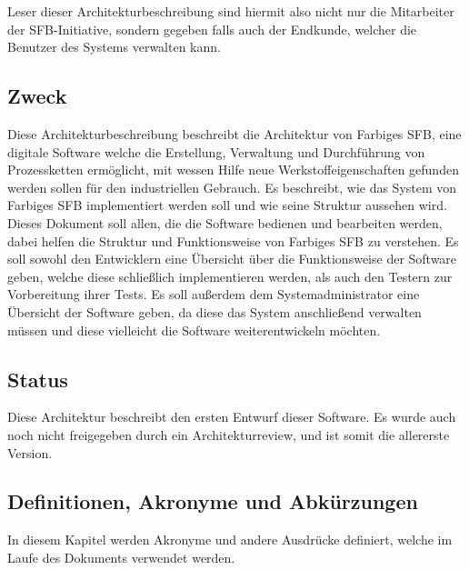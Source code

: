 \documentclass[enabledeprecatedfontcommands,fontsize=12pt,paper=a4,twoside]{scrartcl}
\begin{document}
Leser dieser Architekturbeschreibung sind hiermit also nicht nur die Mitarbeiter der SFB-Initiative, sondern gegeben falls auch der Endkunde, welcher die Benutzer des Systems verwalten kann.

\subsection{Zweck}

  { Diese Architekturbeschreibung beschreibt die Architektur von Farbiges SFB, eine digitale Software welche die Erstellung, Verwaltung und Durchführung von Prozessketten ermöglicht, mit wessen Hilfe neue Werkstoffeigenschaften gefunden werden sollen für den industriellen Gebrauch. Es beschreibt, wie das System von Farbiges SFB implementiert werden soll und wie seine Struktur aussehen wird. 
Dieses Dokument soll allen, die die Software bedienen und bearbeiten werden, dabei helfen die Struktur und Funktionsweise von Farbiges SFB zu verstehen. Es soll sowohl den Entwicklern eine Übersicht über die Funktionsweise der Software geben, welche diese schließlich implementieren werden, als auch den Testern zur Vorbereitung ihrer Tests. Es soll außerdem dem Systemadministrator eine Übersicht der Software geben, da diese das System anschließend verwalten müssen und diese vielleicht die Software weiterentwickeln möchten. 
}

\subsection{Status}

{ Diese Architektur beschreibt den ersten Entwurf dieser Software. Es wurde auch noch nicht freigegeben durch ein Architekturreview, und ist somit die allererste Version.  }



\subsection{Definitionen, Akronyme und Abkürzungen}
In diesem Kapitel werden Akronyme und andere Ausdrücke definiert, welche im Laufe des Dokuments verwendet werden.
\end{document}
